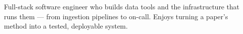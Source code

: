 

\begin{cvparagraph}

Full-stack software engineer who builds data tools and the infrastructure that runs them --- from ingestion pipelines to on-call. Enjoys turning a paper's method into a tested, deployable system.
\end{cvparagraph}
